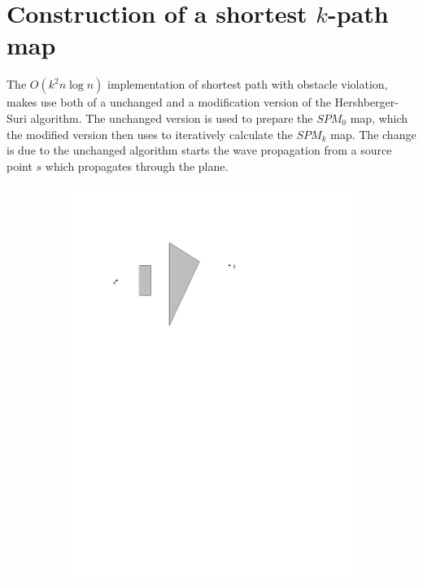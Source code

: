 \section{Construction of a shortest $k$-path map}

The $O(k^2 n \log n)$ implementation of shortest path with obstacle violation, makes use 
both of a unchanged and a modification version of the Hershberger-Suri algorithm. The 
unchanged version is used to prepare the $SPM_0$ map, which the modified version then 
uses to iteratively calculate the $SPM_k$ map. The change is due to the unchanged 
algorithm starts the wave propagation from a source point $s$ which propagates through 
the plane. 

\begin{figure}[H]
\centering
\begin{subfigure}{.5\textwidth}
  \centering 
  \includegraphics[width=.95\linewidth]{figures/prespm0.pdf}
  \caption{}
  \label{fig:spmplane}
\end{subfigure}%

\end{figure}
